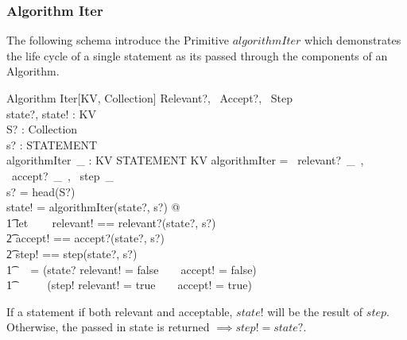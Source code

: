 \documentclass[../main.tex]{subfiles}
\begin{document}
\subsubsection{Algorithm Iter}
The following schema introduce the Primitive $algorithmIter$ which
demonstrates the life cycle of a single statement as its passed through the components of an Algorithm.
\begin{schema}{Algorithm Iter[KV, Collection]}
  Relevant?, ~Accept?, ~Step \\
  state?, state! : KV \\
  S? : Collection \\
  s? : STATEMENT \\
  algorithmIter~\_ : KV \cross STATEMENT \surj KV
  \where
  algorithmIter = \langle ~relevant?~\_~, ~accept?~\_~, ~step~\_ ~\rangle \\
  s? = head(S?) \\
  state! = algorithmIter(state?, s?) @ \\
  \t1 let \ \ ~ relevant! == relevant?(state?, s?) \\
  \t2 accept! == accept?(state?, s?) \\
  \t2 step! == step(state?, s?)\\
  \t1 \ ~ = (state? \iff relevant! = false ~ \lor ~ accept! = false) ~\lor \\
  \t1 \ \ \ \ ~ (step! \iff relevant! = true ~ \land ~ accept! = true)
\end{schema}
If a statement if both relevant and acceptable, $state!$ will be the result of $step$. Otherwise,
the passed in state is returned $\implies step! = state?$.
\end{document}
